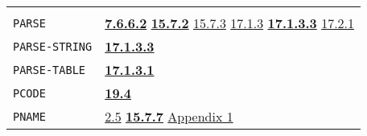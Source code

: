 \documentclass[a4paper,]{article}
\begin{document}
\begin{longtable}[]{@{}ll@{}}
\begin{minipage}[t]{0.70\columnwidth}
\strut
\end{minipage}\tabularnewline
\begin{minipage}[t]{0.24\columnwidth}\raggedright\strut
\texttt{PARSE}\strut
\end{minipage} & \begin{minipage}[t]{0.70\columnwidth}\raggedright\strut
\textbf{\href{07-structured-objects.md\#7662-parse-1}{7.6.6.2}}
\textbf{\href{15-lexical-blocking.md\#1572-parse-and-lparse-again}{15.7.2}}
\href{15-lexical-blocking.md\#1573-lookup}{15.7.3}
\href{17-macro-operations.md\#1713-program-defined-macro-characters}{17.1.3}
\textbf{\href{17-macro-operations.md\#17133-parse-and-lparse-finally}{17.1.3.3}}
\href{17-macro-operations.md\#1721-defmac-and-expand}{17.2.1}\strut
\end{minipage}\tabularnewline
\begin{minipage}[t]{0.24\columnwidth}\raggedright\strut
\texttt{PARSE-STRING}\strut
\end{minipage} & \begin{minipage}[t]{0.70\columnwidth}\raggedright\strut
\textbf{\href{17-macro-operations.md\#17133-parse-and-lparse-finally}{17.1.3.3}}\strut
\end{minipage}\tabularnewline
\begin{minipage}[t]{0.24\columnwidth}\raggedright\strut
\texttt{PARSE-TABLE}\strut
\end{minipage} & \begin{minipage}[t]{0.70\columnwidth}\raggedright\strut
\textbf{\href{17-macro-operations.md\#17131-read-finally}{17.1.3.1}}\strut
\end{minipage}\tabularnewline
\begin{minipage}[t]{0.24\columnwidth}\raggedright\strut
\texttt{PCODE}\strut
\end{minipage} & \begin{minipage}[t]{0.70\columnwidth}\raggedright\strut
\textbf{\href{19-compiled-programs.md\#194-pure-and-impure-code}{19.4}}\strut
\end{minipage}\tabularnewline
\begin{minipage}[t]{0.24\columnwidth}\raggedright\strut
\texttt{PNAME}\strut
\end{minipage} & \begin{minipage}[t]{0.70\columnwidth}\raggedright\strut
\href{02-read-evaluate-print.md\#25-example-type-atom-pname-1}{2.5}
\textbf{\href{15-lexical-blocking.md\#1577-pname}{15.7.7}}
\href{appendix-1-a-look-inside.md\#basic-data-structures}{Appendix 1}\strut
\end{minipage}\tabularnewline

\end{longtable}
\end{document}
